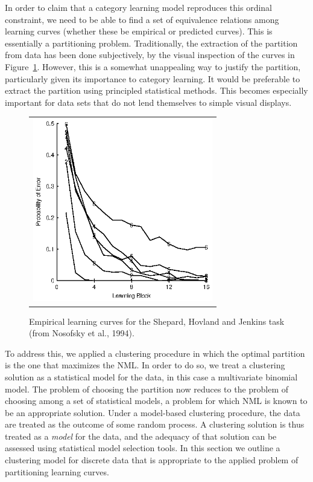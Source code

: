 \documentclass{elsart}
\newcommand{\efc}{\vspace*{15pt}}
\begin{document}
In order to claim that a category learning model reproduces this ordinal constraint, we need to be
able to find a set of equivalence relations among learning curves (whether these be empirical or
predicted curves). This is essentially a partitioning problem. Traditionally, the extraction of
the partition from data has been done subjectively, by the visual inspection of the curves in
Figure~\ref{shj}. However, this is a somewhat unappealing way to justify the partition,
particularly given its importance to category learning. It would be preferable to extract the
partition using principled statistical methods. This becomes especially important for data sets
that do not lend themselves to simple visual displays.


\begin{figure}[t]\begin{center}\begin{tabular}{c}
\includegraphics[height=8cm]{shj.eps}
\end{tabular}\end{center}
 \caption[example]
{\label{shj} Empirical learning curves for the Shepard, Hovland and Jenkins task (from Nosofsky et
al., 1994).}
\efc
\end{figure}


To address this, we applied a clustering procedure in which the optimal partition is the one that
maximizes the NML. In order to do so, we treat a clustering solution as a statistical model for
the data, in this case a multivariate binomial model. The problem of choosing the partition now
reduces to the problem of choosing among a set of statistical models, a problem for which NML is
known to be an appropriate solution. Under a model-based clustering procedure, the data are
treated as the outcome of some random process. A clustering solution is thus treated as a
\emph{model} for the data, and the adequacy of that solution can be assessed using statistical
model selection tools. In this section we outline a clustering model for discrete data that is
appropriate to the applied problem of partitioning learning curves.
\end{document}
